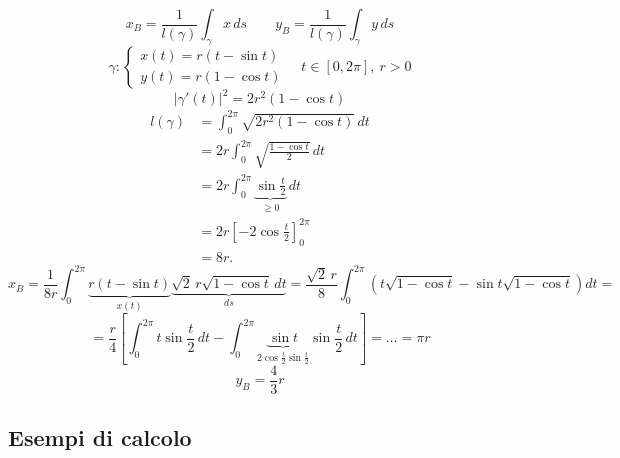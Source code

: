 \begin{example}
\[
x_B = \frac{1}{l(\gamma)} \int_\gamma x \, ds \qquad y_B = \frac{1}{l(\gamma)} \int_\gamma y \, ds
\]
\[
\gamma : \begin{cases}
x(t) = r(t - \sin t) \\
y(t) = r(1 - \cos t)
\end{cases} \quad t \in [0, 2\pi], \ r > 0
\]
\[
\vert \gamma'(t) \vert^2 = 2r^2(1 - \cos t)
\]
\[
\begin{aligned}
l(\gamma)
&= \int_0^{2\pi} \sqrt{2r^2(1-\cos t)}\,dt \\[4pt]
&= 2r \int_0^{2\pi}
\sqrt{\frac{1-\cos t}{2}}\,dt \\[4pt]
&= 2r \int_0^{2\pi}
\underbrace{\sin\frac{t}{2}}_{\geq 0}\,dt \\[4pt]
&= 2r \left[-2\cos\frac{t}{2}\right]_0^{2\pi} \\[4pt]
&= 8r.
\end{aligned}
\]
\[
x_B = \frac{1}{8r} \int_0^{2\pi} \underbrace{r(t - \sin t)}_{x(t)} \underbrace{\sqrt{2}\, r \sqrt{1 - \cos t} \, dt}_{ds} = \frac{\sqrt{2}\, r}{8} \int_0^{2\pi} \left( t\sqrt{1 - \cos t} - \sin t \sqrt{1 - \cos t} \right) dt =
\]
\[
= \frac{r}{4} \left[ \int_0^{2\pi} t \sin\frac{t}{2} \, dt - \int_0^{2\pi} \underbrace{\sin t}_{2\cos\frac{t}{2}\sin\frac{t}{2}} \sin\frac{t}{2} \, dt \right] = \dots = \pi r
\]
\[
y_B = \frac{4}{3} r
\]
\end{example}

\subsection{Esempi di calcolo}

